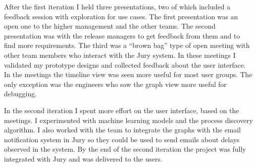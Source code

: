 After the first iteration I held three presentations, two of which included a feedback session with exploration for use cases. The first presentation was an open one to the higher management and the other teams. The second presentation was with the release managers to get feedback from them and to find more requirements. The third was a ``brown bag'' type of open meeting with other team members who interact with the Jury system.
In these meetings I validated my prototype designs and collected feedback about the user interface.
In the meetings the timeline view was seen more useful for most user groups.
The only exception was the engineers who saw the graph view more useful for debugging.

In the second iteration I spent more effort on the user interface, based on the meetings.
I experimented with machine learning models and the process discovery algorithm.
I also worked with the team to integrate the graphs with the email notification system in Jury so they could be used to send emails about delays observed in the system. 
By the end of the second iteration the project was fully integrated with Jury and was delivered to the users.